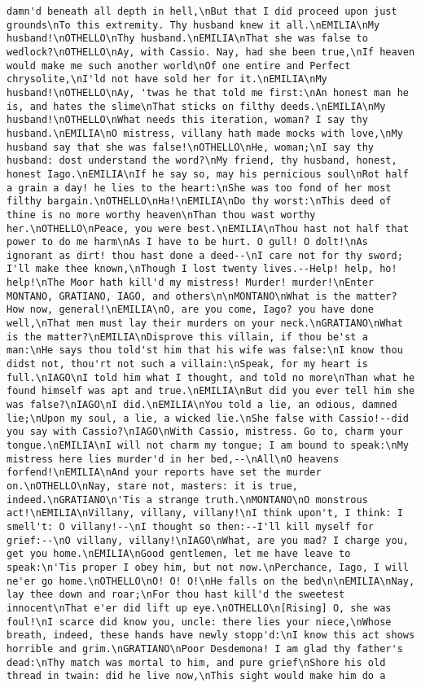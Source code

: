 \begin{verbatim}
damn'd beneath all depth in hell,\nBut that I did proceed upon just grounds\nTo this extremity. Thy husband knew it all.\nEMILIA\nMy husband!\nOTHELLO\nThy husband.\nEMILIA\nThat she was false to wedlock?\nOTHELLO\nAy, with Cassio. Nay, had she been true,\nIf heaven would make me such another world\nOf one entire and Perfect chrysolite,\nI'ld not have sold her for it.\nEMILIA\nMy husband!\nOTHELLO\nAy, 'twas he that told me first:\nAn honest man he is, and hates the slime\nThat sticks on filthy deeds.\nEMILIA\nMy husband!\nOTHELLO\nWhat needs this iteration, woman? I say thy husband.\nEMILIA\nO mistress, villany hath made mocks with love,\nMy husband say that she was false!\nOTHELLO\nHe, woman;\nI say thy husband: dost understand the word?\nMy friend, thy husband, honest, honest Iago.\nEMILIA\nIf he say so, may his pernicious soul\nRot half a grain a day! he lies to the heart:\nShe was too fond of her most filthy bargain.\nOTHELLO\nHa!\nEMILIA\nDo thy worst:\nThis deed of thine is no more worthy heaven\nThan thou wast worthy her.\nOTHELLO\nPeace, you were best.\nEMILIA\nThou hast not half that power to do me harm\nAs I have to be hurt. O gull! O dolt!\nAs ignorant as dirt! thou hast done a deed--\nI care not for thy sword; I'll make thee known,\nThough I lost twenty lives.--Help! help, ho! help!\nThe Moor hath kill'd my mistress! Murder! murder!\nEnter MONTANO, GRATIANO, IAGO, and others\n\nMONTANO\nWhat is the matter? How now, general!\nEMILIA\nO, are you come, Iago? you have done well,\nThat men must lay their murders on your neck.\nGRATIANO\nWhat is the matter?\nEMILIA\nDisprove this villain, if thou be'st a man:\nHe says thou told'st him that his wife was false:\nI know thou didst not, thou'rt not such a villain:\nSpeak, for my heart is full.\nIAGO\nI told him what I thought, and told no more\nThan what he found himself was apt and true.\nEMILIA\nBut did you ever tell him she was false?\nIAGO\nI did.\nEMILIA\nYou told a lie, an odious, damned lie;\nUpon my soul, a lie, a wicked lie.\nShe false with Cassio!--did you say with Cassio?\nIAGO\nWith Cassio, mistress. Go to, charm your tongue.\nEMILIA\nI will not charm my tongue; I am bound to speak:\nMy mistress here lies murder'd in her bed,--\nAll\nO heavens forfend!\nEMILIA\nAnd your reports have set the murder on.\nOTHELLO\nNay, stare not, masters: it is true, indeed.\nGRATIANO\n'Tis a strange truth.\nMONTANO\nO monstrous act!\nEMILIA\nVillany, villany, villany!\nI think upon't, I think: I smell't: O villany!--\nI thought so then:--I'll kill myself for grief:--\nO villany, villany!\nIAGO\nWhat, are you mad? I charge you, get you home.\nEMILIA\nGood gentlemen, let me have leave to speak:\n'Tis proper I obey him, but not now.\nPerchance, Iago, I will ne'er go home.\nOTHELLO\nO! O! O!\nHe falls on the bed\n\nEMILIA\nNay, lay thee down and roar;\nFor thou hast kill'd the sweetest innocent\nThat e'er did lift up eye.\nOTHELLO\n[Rising] O, she was foul!\nI scarce did know you, uncle: there lies your niece,\nWhose breath, indeed, these hands have newly stopp'd:\nI know this act shows horrible and grim.\nGRATIANO\nPoor Desdemona! I am glad thy father's dead:\nThy match was mortal to him, and pure grief\nShore his old thread in twain: did he live now,\nThis sight would make him do a 
\end{verbatim}

